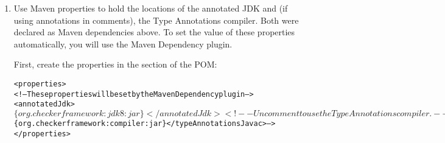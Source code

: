 \begin{enumerate}
\begin{enumerate}
\begin{alltt}
  ...

  <dependencies>
    ... existing <dependency> items ...

    <!-- Annotations from the Checker Framework: nullness, interning, locking, ... -->
    <dependency>
      <groupId>org.checkerframework</groupId>
      <artifactId>checker-qual</artifactId>
      <version>\$\{checkerframework.version\}</version>
      <scope>system</scope>
      <systemPath>\$\{env.CHECKERFRAMEWORK\}/checker/dist/checker-qual.jar</systemPath>
    </dependency>
    <dependency>
      <groupId>org.checkerframework</groupId>
      <artifactId>checker</artifactId>
      <version>\$\{checkerframework.version\}</version>
      <scope>system</scope>
      <systemPath>\$\{env.CHECKERFRAMEWORK\}/checker/dist/checker.jar</systemPath>
    </dependency>
    <!-- The Type Annotations compiler. Uncomment if using annotations in comments. -->
    <!-- <dependency>
      <groupId>org.checkerframework</groupId>
      <artifactId>compiler</artifactId>
      <version>\$\{checkerframework.version\}</version>
      <scope>system</scope>
      <systemPath>\$\{env.CHECKERFRAMEWORK\}/checker/dist/javac.jar</systemPath>
    </dependency> -->
    <!-- The annotated JDK to use. -->
    <dependency>
      <groupId>org.checkerframework</groupId>
      <artifactId>jdk8</artifactId>
      <version>\$\{checkerframework.version\}</version>
      <scope>system</scope>
      <systemPath>\$\{env.CHECKERFRAMEWORK\}/checker/dist/jdk8.jar</systemPath>
    </dependency>
  </dependencies>
\end{alltt}
\end{enumerate}


\item Use Maven properties to hold the locations of the
  annotated JDK and (if using annotations in comments), the Type Annotations compiler.  Both were declared as Maven dependencies above.
To set the value of these properties automatically, you will use the Maven Dependency plugin.

First, create the properties in the  section of the POM:

\begin{alltt}
<properties>
  <!-- These properties will be set by the Maven Dependency plugin -->
  <annotatedJdk>$\{org.checkerframework:jdk8:jar\}</annotatedJdk>
  <!-- Uncomment to use the Type Annotations compiler. -->
  <!-- <typeAnnotationsJavac>$\{org.checkerframework:compiler:jar\}</typeAnnotationsJavac> -->
</properties>
\end{alltt}


\end{enumerate}
